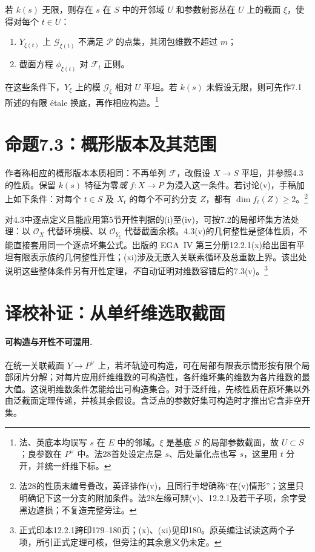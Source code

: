 \documentclass[openany,fontset=fandol]{ctexbook}
\newcommand{\FF}{\mathcal F}
\newcommand{\GG}{\mathcal G}
\newcommand{\OO}{\mathcal O}
\newcommand{\calP}{\mathcal P}
\begin{document}
若 $k(s)$ 无限，则存在 $s$ 在 $S$ 中的开邻域 $U$ 和参数射影丛在 $U$ 上的截面 $\xi$，使得对每个 $t\in U$：
\begin{enumerate}[label=(\roman*)]
\item $Y_{\xi(t)}$ 上 $\GG_{\xi(t)}$ 不满足 $\calP$ 的点集，其闭包维数不超过 $m$；
\item 截面方程 $\phi_{\xi(t)}$ 对 $\FF_t$ 正则。
\end{enumerate}
在这些条件下，$Y_\xi$ 上的模 $\GG_\xi$ 相对 $U$ 平坦。若 $k(s)$ 未假设无限，则可先作7.1所述的有限 étale 换底，再作相应构造。\footnote{法、英底本均误写 $s$ 在 $E$ 中的邻域。$\xi$ 是基底 $S$ 的局部参数截面，故 $U\subset S$；良参数在 $P^\vee$ 中。法28首处设定点是 $s$、后处量化点也写 $s$，这里用 $t$ 分开，并统一纤维下标。}

\section*{命题7.3：概形版本及其范围}
作者称相应的概形版本本质相同：不再单列 $\FF$，改假设 $X\to S$ 平坦，并参照4.3的性质。保留 $k(s)$ 特征为零\emph{或} $f:X\to P$ 为浸入这一条件。若讨论(v)，手稿加上如下条件：对每个 $t\in S$ 及 $X_t$ 的每个不可约分支 $Z$，都有 $\dim\overline{f_t(Z)}\ge2$。\footnote{法28的性质末编号叠改，英译排作(v)，且同行手增确称“在(v)情形”；这里只明确记下这一分支的附加条件。法28左缘可辨(v)、12.2.1及若干子项，余字受黑边遮损；不复造完整旁注。}

对4.3中逐点定义且能应用第5节开性判据的(i)至(iv)，可按7.2的局部坏集方法处理：以 $\OO_X$ 代替环境模、以 $\OO_{Y_\xi}$ 代替截面余核。4.3(v)的几何整性是整体性质，不能直接套用同一个逐点坏集公式。出版的 EGA~IV 第三分册12.2.1(x)给出固有平坦有限表示族的几何整性开性；(xi)涉及无嵌入关联素循环及总重数上界。该出处说明这些整体条件另有开性定理，\emph{不}自动证明对维数容错后的7.3(v)。\footnote{正式印本12.2.1跨印179--180页；(x)、(xi)见印180。原英编注试读这两个子项，所引正式定理可核，但旁注的其余意义仍未定。}

\section*{译校补证：从单纤维选取截面}
\paragraph{可构造与开性不可混用.}
在统一关联截面 $Y\to P^\vee$ 上，若坏轨迹可构造，可在局部有限表示情形按有限个局部闭片分解；对每片应用纤维维数的可构造性，各纤维坏集的维数为各片维数的最大值。这说明维数条件怎能给出可构造集合。对于泛纤维，先核性质在原坏集以外由泛截面定理传递，并核其余假设。含泛点的参数好集可构造时才推出它含非空开集。
\end{document}
